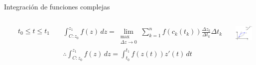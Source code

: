 \documentclass[9pt, aspectratio=169]{beamer}
\begin{document}
\begin{frame}{Integración de funciones complejas}
\begin{columns}[t]
   $\qquad t_0 \leq t \leq t_1$ 

   \begin{multline*} \int_{C: z_0}^{z_1} f(z) \, dz = \lim_{\substack{\max \\ \Delta z \rightarrow 0}} \sum_{k=1}^n f(c_k(t_k)) \frac{\Delta z_k}{\Delta t_k} \Delta t_k \\
       \therefore \int_{C: z_0}^{z_1} f(z) \, dz = \int_{t_0}^{t_1} f(z(t)) z'(t) \, dt
   \end{multline*}

  \vspace{2em}
  \begin{center}
      \includegraphics[width=0.85\textwidth]{figs/fig-02.pdf}
  \end{center}

\end{columns}


\end{frame}
\end{document}
